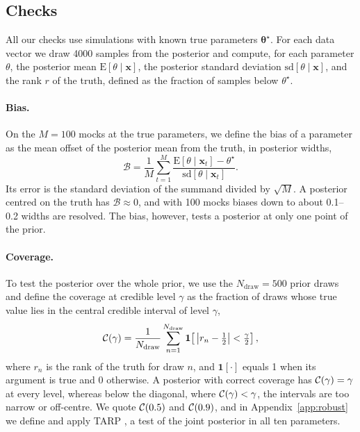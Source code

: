 \subsection{Checks}\label{sec:inference:checks}

All our checks use simulations with known true parameters $\bm\theta^\star$. For each data vector we draw
4000 samples from the posterior and compute, for each parameter $\theta$, the posterior mean
$\mathrm E[\theta\mid\bm x]$, the posterior standard deviation $\mathrm{sd}[\theta\mid\bm x]$, and the
rank $r$ of the truth, defined as the fraction of samples below $\theta^\star$.

\paragraph*{Bias.} On the $M=100$ mocks at the true parameters, we define the bias of a parameter as the
mean offset of the posterior mean from the truth, in posterior widths,
\begin{equation}
\mathcal B = \frac{1}{M}\sum_{t=1}^{M}\frac{\mathrm E[\theta\mid\bm x_t]-\theta^\star}{\mathrm{sd}[\theta\mid\bm x_t]}.
\label{eq:bias}
\end{equation}
Its error is the standard deviation of the summand divided by $\sqrt{M}$. A posterior centred on the truth
has $\mathcal B\approx0$, and with 100 mocks biases down to about 0.1--0.2 widths are resolved. The bias,
however, tests a posterior at only one point of the prior.

\paragraph*{Coverage.} To test the posterior over the whole prior, we use the $N_\mathrm{draw}=500$ prior
draws and define the coverage at credible level $\gamma$ as the fraction of draws whose true value lies in
the central credible interval of level $\gamma$,
\begin{equation}
\mathcal{C}(\gamma) = \frac{1}{N_\mathrm{draw}}\sum_{n=1}^{N_\mathrm{draw}}
\mathbf 1\!\left[\,\left|r_n-\tfrac12\right|<\tfrac{\gamma}{2}\right],
\label{eq:coverage}
\end{equation}
where $r_n$ is the rank of the truth for draw $n$, and $\mathbf 1[\cdot]$ equals 1 when its argument is
true and 0 otherwise. A posterior with correct coverage has $\mathcal{C}(\gamma)=\gamma$ at every level, whereas
below the diagonal, where $\mathcal{C}(\gamma)<\gamma$, the intervals are too narrow or off-centre. We quote
$\mathcal{C}(0.5)$ and $\mathcal{C}(0.9)$, and in Appendix~\ref{app:robust} we define and apply TARP \citep{Lemos2023},
a test of the joint posterior in all ten parameters.

